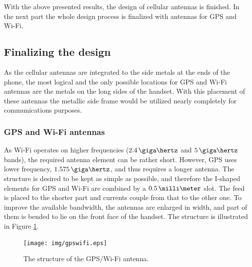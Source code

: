 With the above presented results, the design of cellular antennas is finished. In the next part the whole design process is finalized with antennas for GPS and Wi-Fi.

\subsection{Finalizing the design}
\label{sec:sim_final}

As the cellular antennas are integrated to the side metals at the ends of the phone, the most logical and the only possible locations for GPS and Wi-Fi antennas are the metals on the long sides of the handset. With this placement of these antennas the metallic side frame would be utilized nearly completely for communications purposes.

\vspace{-8pt}
\subsubsection{GPS and Wi-Fi antennas}
\label{sec:gpswifi}
\vspace{-2pt}
As Wi-Fi operates on higher frequencies ($2.4\,\giga\hertz$ and $5\,\giga\hertz$ bands), the required antenna element can be rather short. However, GPS uses lower frequency, $1.575\,\giga\hertz$, and thus requires a longer antenna. The structure is desired to be kept as simple as possible, and therefore the I-shaped elements for GPS and Wi-Fi are combined by a $0.5\,\milli\meter$ slot. The feed is placed to the shorter part and currents couple from that to the other one. To improve the available bandwidth, the antennas are enlarged in width, and part of them is bended to lie on the front face of the handset. The structure is illustrated in Figure \ref{fig:gps_struct}.
\begin{figure}[H]
    \centering
    \vspace{-10pt}
    \texttt{[image: img/gpswifi.eps]}
    \caption{The structure of the GPS/Wi-Fi antenna.}
    \label{fig:gps_struct}
    \vspace{-7pt}
\end{figure}

